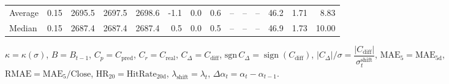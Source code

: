 \begin{threeparttable}
{\begin{tabular}{lrrrrrrrrrrrrr}
Average &     0.15 & 2695.5 & 2697.5 & 2698.6 &       -1.1 &                      0.0 &                 0.6 &         -- &        -- &             -- &             46.2 &            1.71 &                   8.83 \\
 Median &     0.15 & 2687.4 & 2687.4 & 2687.4 &        0.5 &                      0.0 &                 0.5 &         -- &        -- &             -- &             46.9 &            1.73 &                  10.00 \\
\bottomrule
\end{tabular}
}
\begin{tablenotes}\footnotesize
\item $\kappa=\kappa(\sigma)$, $B=B_{t-1}$, $C_p=C_{\text{pred}}$, $C_r=C_{\text{real}}$, $C_\Delta=C_{\text{diff}}$, $\mathrm{sgn}\,C_\Delta=\operatorname{sign}(C_{\text{diff}})$, $|C_\Delta|/\sigma=\dfrac{|C_{\text{diff}}|}{\sigma_t^{\text{shift}}}$, $\mathrm{MAE}_5=\mathrm{MAE}_{5\text{d}}$, $\mathrm{RMAE}= \mathrm{MAE}_5 / \text{Close}$, $\mathrm{HR}_{20}=\mathrm{HitRate}_{20\text{d}}$, 
$\lambda_{\text{shift}}=\lambda_t$, 
$\Delta\alpha_t=\alpha_t-\alpha_{t-1}$.
\end{tablenotes}
\end{threeparttable}
\endgroup

